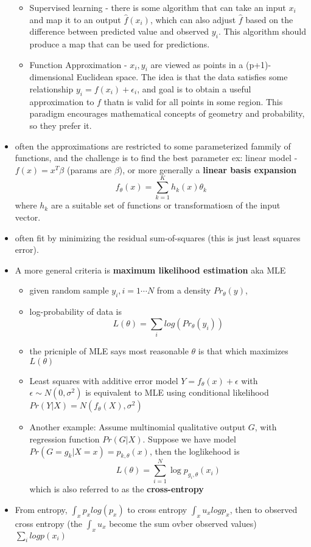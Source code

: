 \begin{itemize}
    \begin{itemize}
      \item Supervised learning - there is some algorithm that can take an input $x_i$ and map it to an output $\hat{f}(x_i)$, which can also adjust $\hat{f}$ based on the difference between predicted value and observed $y_i$. This algorithm should produce a map that can be used for predictions.
      \item Function Approximation - ${x_i, y_i}$ are viewed as points in a (p+1)-dimensional Euclidean space. The idea is that the data satisfies some relationship $ y_i = f(x_i) + \epsilon_i$, and goal is to obtain a useful approximation to $f$ thatn is valid for all points in some region.
	\subitem This paradigm encourages mathematical concepts of geometry and probability, so they prefer it.
    \end{itemize}
  \item often the approximations are restricted to some parameterized fammily of functions, and the challenge is to find the best parameter
    \subitem ex: linear model - $f(x) = x^T\beta$ (params are $\beta$), or more generally a {\bf linear basis expansion}
    $$f_\theta(x) = \sum_{k=1}^{K} h_k(x)\theta_k $$
    where $h_k$ are a suitable set of functions or transformatiosn of the input vector.
  \item often fit by minimizing the residual sum-of-squares (this is just least squares error).
  \item A more general criteria is {\bf maximum likelihood estimation} aka MLE	
    \begin{itemize}
      \item given random sample $y_i, i=1\cdots N$ from a density $Pr_\theta(y)$,
      \item log-probability of data is 
	$$ L(\theta) = \sum_i log(Pr_\theta(y_i)) $$
      \item the pricniple of MLE says most reasonable $\theta$ is that which maximizes $L(\theta)$
      \item Least squares with additive error model $Y = f_\theta(x) + \epsilon$ with $\epsilon \sim N(0, \sigma^2)$ is equivalent to MLE using conditional likelihood $Pr(Y | X) = N(f_\theta(X), \sigma^2)$
      \item Another example: Assume multinomial qualitative output $G$, with regression function $Pr(G|X)$. Suppose we have model $Pr(G = g_k | X = x) = p_{k,\theta}(x)$, then the loglikehood is
	$$ L(\theta) = \sum_{i=1}^N \log p_{g_i, \theta}(x_i) $$
	which is also referred to as the {\bf cross-entropy}
    \end{itemize}
  \item {\gray From entropy, $\int_x p_x log(p_x)$ to cross entropy $\int_x u_x log p_x$, then to observed cross entropy (the $\int_x u_x$ become the sum ovber observed values) $\sum_i log p(x_i)$}
\end{itemize}	

